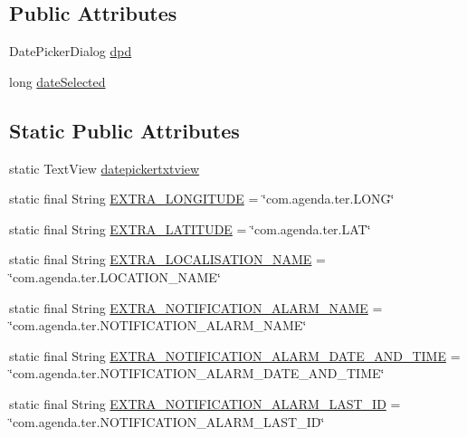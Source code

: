 \subsection*{Public Attributes}
\begin{DoxyCompactItemize}
\item 
Date\-Picker\-Dialog \hyperlink{classcom_1_1agenda_1_1ter_1_1smartgenda_1_1_event_activity_a19b13ea96776cf55c8ae9c9578048e25}{dpd}
\item 
long \hyperlink{classcom_1_1agenda_1_1ter_1_1smartgenda_1_1_event_activity_a029eb7bf1a3656c2e4e924277fb43f2a}{date\-Selected}
\end{DoxyCompactItemize}
\subsection*{Static Public Attributes}
\begin{DoxyCompactItemize}
\item 
static Text\-View \hyperlink{classcom_1_1agenda_1_1ter_1_1smartgenda_1_1_event_activity_a9bdbd929a45a6b9230c1e74bcebc4e25}{datepickertxtview}
\item 
static final String \hyperlink{classcom_1_1agenda_1_1ter_1_1smartgenda_1_1_event_activity_a41bcecc4f2cfdd52cc47dee2224faaa0}{E\-X\-T\-R\-A\-\_\-\-L\-O\-N\-G\-I\-T\-U\-D\-E} = \char`\"{}com.\-agenda.\-ter.\-L\-O\-N\-G\char`\"{}
\item 
static final String \hyperlink{classcom_1_1agenda_1_1ter_1_1smartgenda_1_1_event_activity_ae8f0b17af8c2dc56dce6026f9ffe472d}{E\-X\-T\-R\-A\-\_\-\-L\-A\-T\-I\-T\-U\-D\-E} = \char`\"{}com.\-agenda.\-ter.\-L\-A\-T\char`\"{}
\item 
static final String \hyperlink{classcom_1_1agenda_1_1ter_1_1smartgenda_1_1_event_activity_ae52ecdb7aabb645cd4ce5d0618e7000e}{E\-X\-T\-R\-A\-\_\-\-L\-O\-C\-A\-L\-I\-S\-A\-T\-I\-O\-N\-\_\-\-N\-A\-M\-E} = \char`\"{}com.\-agenda.\-ter.\-L\-O\-C\-A\-T\-I\-O\-N\-\_\-\-N\-A\-M\-E\char`\"{}
\item 
static final String \hyperlink{classcom_1_1agenda_1_1ter_1_1smartgenda_1_1_event_activity_a01c5623d56b35241c093f2a1dda4e82e}{E\-X\-T\-R\-A\-\_\-\-N\-O\-T\-I\-F\-I\-C\-A\-T\-I\-O\-N\-\_\-\-A\-L\-A\-R\-M\-\_\-\-N\-A\-M\-E} = \char`\"{}com.\-agenda.\-ter.\-N\-O\-T\-I\-F\-I\-C\-A\-T\-I\-O\-N\-\_\-\-A\-L\-A\-R\-M\-\_\-\-N\-A\-M\-E\char`\"{}
\item 
static final String \hyperlink{classcom_1_1agenda_1_1ter_1_1smartgenda_1_1_event_activity_a456a98921d6ad880c4a953d75908cc3b}{E\-X\-T\-R\-A\-\_\-\-N\-O\-T\-I\-F\-I\-C\-A\-T\-I\-O\-N\-\_\-\-A\-L\-A\-R\-M\-\_\-\-D\-A\-T\-E\-\_\-\-A\-N\-D\-\_\-\-T\-I\-M\-E} = \char`\"{}com.\-agenda.\-ter.\-N\-O\-T\-I\-F\-I\-C\-A\-T\-I\-O\-N\-\_\-\-A\-L\-A\-R\-M\-\_\-\-D\-A\-T\-E\-\_\-\-A\-N\-D\-\_\-\-T\-I\-M\-E\char`\"{}
\item 
static final String \hyperlink{classcom_1_1agenda_1_1ter_1_1smartgenda_1_1_event_activity_a30422ed20c08c32c0bf052837286005d}{E\-X\-T\-R\-A\-\_\-\-N\-O\-T\-I\-F\-I\-C\-A\-T\-I\-O\-N\-\_\-\-A\-L\-A\-R\-M\-\_\-\-L\-A\-S\-T\-\_\-\-I\-D} = \char`\"{}com.\-agenda.\-ter.\-N\-O\-T\-I\-F\-I\-C\-A\-T\-I\-O\-N\-\_\-\-A\-L\-A\-R\-M\-\_\-\-L\-A\-S\-T\-\_\-\-I\-D\char`\"{}
\end{DoxyCompactItemize}
